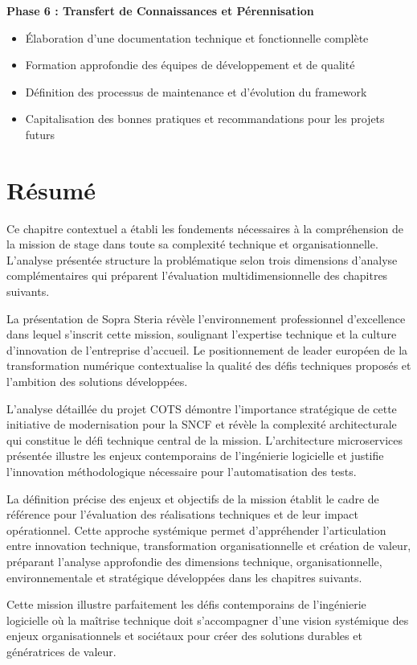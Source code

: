 \textbf{Phase 6 : Transfert de Connaissances et Pérennisation}
\begin{itemize}
    \item Élaboration d'une documentation technique et fonctionnelle complète
    \item Formation approfondie des équipes de développement et de qualité
    \item Définition des processus de maintenance et d'évolution du framework
    \item Capitalisation des bonnes pratiques et recommandations pour les projets futurs
\end{itemize}

\section{Résumé}

Ce chapitre contextuel a établi les fondements nécessaires à la compréhension de la mission de stage dans toute sa complexité technique et organisationnelle. L'analyse présentée structure la problématique selon trois dimensions d'analyse complémentaires qui préparent l'évaluation multidimensionnelle des chapitres suivants.

La présentation de Sopra Steria révèle l'environnement professionnel d'excellence dans lequel s'inscrit cette mission, soulignant l'expertise technique et la culture d'innovation de l'entreprise d'accueil. Le positionnement de leader européen de la transformation numérique contextualise la qualité des défis techniques proposés et l'ambition des solutions développées.

L'analyse détaillée du projet COTS démontre l'importance stratégique de cette initiative de modernisation pour la SNCF et révèle la complexité architecturale qui constitue le défi technique central de la mission. L'architecture microservices présentée illustre les enjeux contemporains de l'ingénierie logicielle et justifie l'innovation méthodologique nécessaire pour l'automatisation des tests.

La définition précise des enjeux et objectifs de la mission établit le cadre de référence pour l'évaluation des réalisations techniques et de leur impact opérationnel. Cette approche systémique permet d'appréhender l'articulation entre innovation technique, transformation organisationnelle et création de valeur, préparant l'analyse approfondie des dimensions technique, organisationnelle, environnementale et stratégique développées dans les chapitres suivants.

Cette mission illustre parfaitement les défis contemporains de l'ingénierie logicielle où la maîtrise technique doit s'accompagner d'une vision systémique des enjeux organisationnels et sociétaux pour créer des solutions durables et génératrices de valeur.